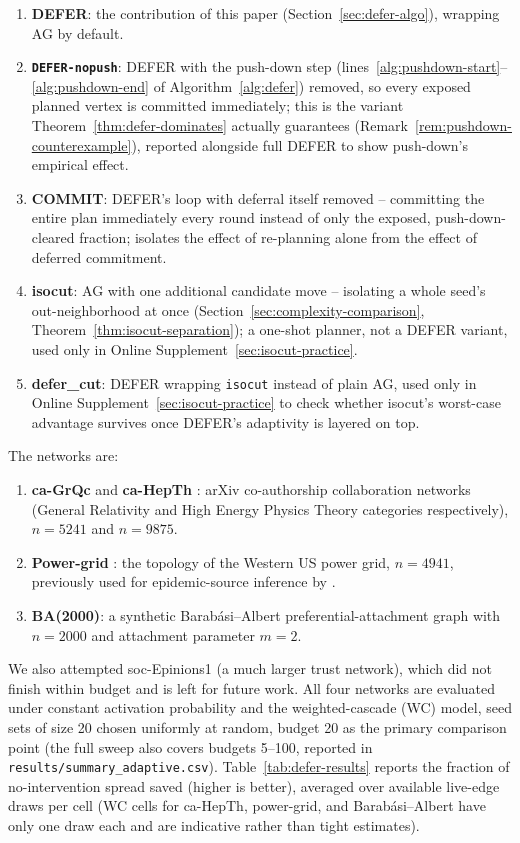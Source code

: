 \documentclass[ijoc,sglanonrev]{informs4}
\begin{document}
\begin{enumerate}
\item \textbf{DEFER}: the contribution of this paper (Section~\ref{sec:defer-algo}),
  wrapping AG by default.
\item \textbf{\texttt{DEFER-nopush}}: DEFER with the push-down step
  (lines~\ref{alg:pushdown-start}--\ref{alg:pushdown-end} of
  Algorithm~\ref{alg:defer}) removed, so every exposed planned vertex is
  committed immediately; this is the variant Theorem~\ref{thm:defer-dominates}
  actually guarantees (Remark~\ref{rem:pushdown-counterexample}), reported
  alongside full DEFER to show push-down's empirical effect.
\item \textbf{COMMIT}: DEFER's loop with deferral itself removed --
  committing the entire plan immediately every round instead of only the
  exposed, push-down-cleared fraction; isolates the effect of re-planning
  alone from the effect of deferred commitment.
\item \textbf{isocut}: AG with one additional candidate move -- isolating
  a whole seed's out-neighborhood at once
  (Section~\ref{sec:complexity-comparison}, Theorem~\ref{thm:isocut-separation});
  a one-shot planner, not a DEFER variant, used only in
  Online Supplement~\ref{sec:isocut-practice}.
\item \textbf{defer\_cut}: DEFER wrapping \texttt{isocut} instead of plain
  AG, used only in Online Supplement~\ref{sec:isocut-practice} to check
  whether isocut's worst-case advantage survives once DEFER's adaptivity
  is layered on top.
\end{enumerate}

\noindent The networks are:

\begin{enumerate}
\item \textbf{ca-GrQc} and \textbf{ca-HepTh} \citep{leskovec2007}: arXiv
  co-authorship collaboration networks (General Relativity and High Energy
  Physics Theory categories respectively), $n=5241$ and $n=9875$.
\item \textbf{Power-grid} \citep{watts1998}: the topology of the Western
  US power grid, $n=4941$, previously used for epidemic-source inference
  by \citet{lokhov2014}.
\item \textbf{BA(2000)}: a synthetic Barab\'asi--Albert preferential-attachment
  graph \citep{barabasi1999} with $n=2000$ and attachment parameter $m=2$.
\end{enumerate}

\noindent We also attempted soc-Epinions1 (a much larger trust network),
which did not finish within budget and is left for future work. All four
networks are evaluated under constant activation probability and the
weighted-cascade (WC) model, seed sets of size 20 chosen uniformly at
random, budget 20 as the primary comparison point (the full sweep also
covers budgets 5--100, reported in
\texttt{results/summary\_adaptive.csv}). Table~\ref{tab:defer-results}
reports the fraction of no-intervention spread saved (higher is better),
averaged over available live-edge draws per cell (WC cells for ca-HepTh,
power-grid, and Barab\'asi--Albert have only one draw each and are
indicative rather than tight estimates).
\end{document}
